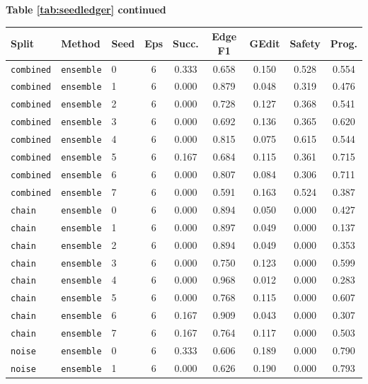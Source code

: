 \documentclass{article}
\begin{document}
\begin{center}
\textbf{Table \ref{tab:seedledger} continued}\\[0.4ex]
\begin{tabular}{lllcccccc}
\toprule
Split & Method & Seed & Eps & Succ. & Edge F1 & GEdit & Safety & Prog. \\
\midrule
\texttt{combined} & \texttt{ensemble} & 0 & 6 & 0.333 & 0.658 & 0.150 & 0.528 & 0.554 \\
\texttt{combined} & \texttt{ensemble} & 1 & 6 & 0.000 & 0.879 & 0.048 & 0.319 & 0.476 \\
\texttt{combined} & \texttt{ensemble} & 2 & 6 & 0.000 & 0.728 & 0.127 & 0.368 & 0.541 \\
\texttt{combined} & \texttt{ensemble} & 3 & 6 & 0.000 & 0.692 & 0.136 & 0.365 & 0.620 \\
\texttt{combined} & \texttt{ensemble} & 4 & 6 & 0.000 & 0.815 & 0.075 & 0.615 & 0.544 \\
\texttt{combined} & \texttt{ensemble} & 5 & 6 & 0.167 & 0.684 & 0.115 & 0.361 & 0.715 \\
\texttt{combined} & \texttt{ensemble} & 6 & 6 & 0.000 & 0.807 & 0.084 & 0.306 & 0.711 \\
\texttt{combined} & \texttt{ensemble} & 7 & 6 & 0.000 & 0.591 & 0.163 & 0.524 & 0.387 \\
\texttt{chain} & \texttt{ensemble} & 0 & 6 & 0.000 & 0.894 & 0.050 & 0.000 & 0.427 \\
\texttt{chain} & \texttt{ensemble} & 1 & 6 & 0.000 & 0.897 & 0.049 & 0.000 & 0.137 \\
\texttt{chain} & \texttt{ensemble} & 2 & 6 & 0.000 & 0.894 & 0.049 & 0.000 & 0.353 \\
\texttt{chain} & \texttt{ensemble} & 3 & 6 & 0.000 & 0.750 & 0.123 & 0.000 & 0.599 \\
\texttt{chain} & \texttt{ensemble} & 4 & 6 & 0.000 & 0.968 & 0.012 & 0.000 & 0.283 \\
\texttt{chain} & \texttt{ensemble} & 5 & 6 & 0.000 & 0.768 & 0.115 & 0.000 & 0.607 \\
\texttt{chain} & \texttt{ensemble} & 6 & 6 & 0.167 & 0.909 & 0.043 & 0.000 & 0.307 \\
\texttt{chain} & \texttt{ensemble} & 7 & 6 & 0.167 & 0.764 & 0.117 & 0.000 & 0.503 \\
\texttt{noise} & \texttt{ensemble} & 0 & 6 & 0.333 & 0.606 & 0.189 & 0.000 & 0.790 \\
\texttt{noise} & \texttt{ensemble} & 1 & 6 & 0.000 & 0.626 & 0.190 & 0.000 & 0.793 \\

\end{tabular}
\end{center}
\end{document}
